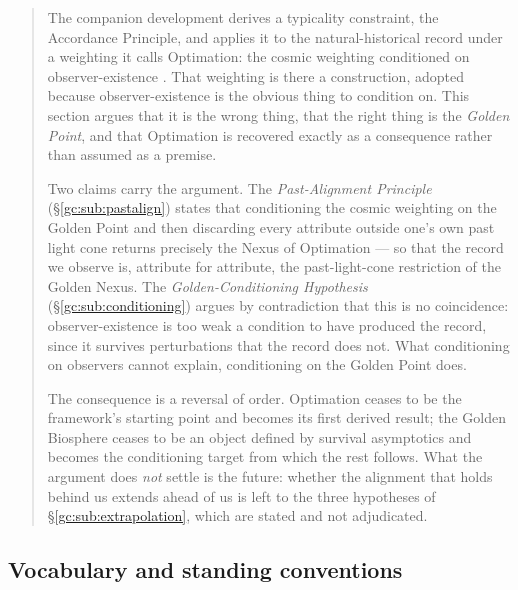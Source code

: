 \documentclass[11pt]{article}
\numberwithin{equation}{section}
\theoremstyle{plain}
\theoremstyle{definition}
\theoremstyle{remark}
\begin{document}
\begin{quote}\small
The companion development derives a typicality constraint, the
Accordance Principle, and applies it to the natural-historical record
under a weighting it calls Optimation: the cosmic weighting conditioned
on observer-existence \cite{Nexus, Ben26Found, Ben26Optimal}. That
weighting is there a construction, adopted because observer-existence is
the obvious thing to condition on. This section argues that it is the
wrong thing, that the right thing is the \emph{Golden Point}, and that
Optimation is recovered exactly as a consequence rather than assumed as
a premise.

Two claims carry the argument. The \emph{Past-Alignment Principle}
(\S\ref{gc:sub:pastalign}) states that conditioning the cosmic weighting
on the Golden Point and then discarding every attribute outside one's
own past light cone returns precisely the Nexus of Optimation --- so
that the record we observe is, attribute for attribute, the past-light-cone
restriction of the Golden Nexus. The \emph{Golden-Conditioning
Hypothesis} (\S\ref{gc:sub:conditioning}) argues by contradiction that
this is no coincidence: observer-existence is too weak a condition to
have produced the record, since it survives perturbations that the
record does not. What conditioning on observers cannot explain,
conditioning on the Golden Point does.

The consequence is a reversal of order. Optimation ceases to be the
framework's starting point and becomes its first derived result; the
Golden Biosphere ceases to be an object defined by survival asymptotics
and becomes the conditioning target from which the rest follows. What
the argument does \emph{not} settle is the future: whether the alignment
that holds behind us extends ahead of us is left to the three
hypotheses of \S\ref{gc:sub:extrapolation}, which are stated and not
adjudicated.
\end{quote}

\subsection{Vocabulary and standing conventions}\label{gc:sub:vocab}
\end{document}
